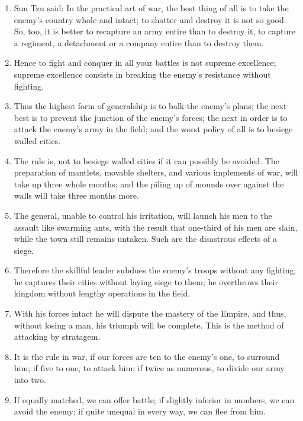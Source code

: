 \begin{enumerate}
\item Sun Tzu said: In the practical art of war, the best thing of all
  is to take the enemy's country whole and intact; to shatter and
  destroy it is not so good. So, too, it is better to recapture an
  army entire than to destroy it, to capture a regiment, a detachment
  or a company entire than to destroy them.

\item Hence to fight and conquer in all your battles is not supreme
  excellence; supreme excellence consists in breaking the enemy's
  resistance without fighting.

\item Thus the highest form of generalship is to balk the enemy's
  plans; the next best is to prevent the junction of the enemy's
  forces; the next in order is to attack the enemy's army in the
  field; and the worst policy of all is to besiege walled cities.

\item The rule is, not to besiege walled cities if it can possibly be
  avoided. The preparation of mantlets, movable shelters, and various
  implements of war, will take up three whole months; and the piling
  up of mounds over against the walls will take three months more.

\item The general, unable to control his irritation, will launch his
  men to the assault like swarming ants, with the result that
  one-third of his men are slain, while the town still remains
  untaken. Such are the disastrous effects of a siege.

\item Therefore the skillful leader subdues the enemy's troops without
  any fighting; he captures their cities without laying siege to them;
  he overthrows their kingdom without lengthy operations in the field.

\item With his forces intact he will dispute the mastery of the
  Empire, and thus, without losing a man, his triumph will be
  complete. This is the method of attacking by stratagem.

\item It is the rule in war, if our forces are ten to the enemy's one,
  to surround him; if five to one, to attack him; if twice as
  numerous, to divide our army into two.

\item If equally matched, we can offer battle; if slightly inferior in
  numbers, we can avoid the enemy; if quite unequal in every way, we
  can flee from him.


\end{enumerate}
